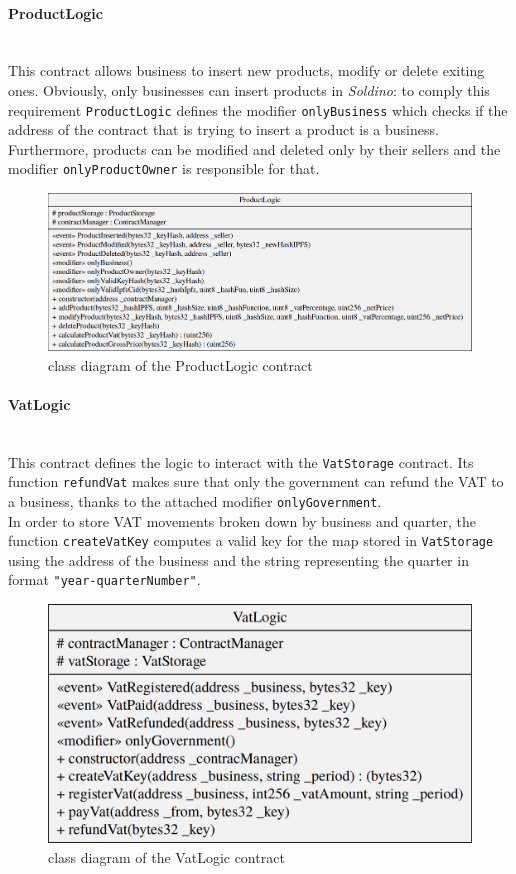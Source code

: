 \paragraph{ProductLogic}\mbox{}\\

\noindent This contract allows business to insert new products, modify or delete exiting ones. Obviously, only businesses can insert products in \textit{Soldino}: to comply this requirement \texttt{ProductLogic} defines the modifier \texttt{onlyBusiness} which checks if the address of the contract that is trying to insert a product is a business. Furthermore, products can be modified and deleted only by their sellers and the modifier \texttt{onlyProductOwner} is responsible for that.
\begin{figure}[H]
	\centering
	\includegraphics[scale=0.25]{res/images/solidity/productlogic.png}
	\caption{class diagram of the ProductLogic contract}
\end{figure}
\pagebreak
\paragraph{VatLogic}\mbox{}\\

\noindent This contract defines the logic to interact with the \texttt{VatStorage} contract. 
Its function \texttt{refundVat} makes sure that only the government can refund the VAT to a business, thanks to the attached modifier \texttt{onlyGovernment}.\\
In order to store VAT movements broken down by business and quarter, the function \texttt{createVatKey} computes a valid key for the map stored in \texttt{VatStorage} using the address of the business and the string representing the quarter in format \texttt{"year-quarterNumber"}. 
\begin{figure}[H]
	\centering
	\includegraphics[scale=0.20]{res/images/solidity/vatlogic.png}
	\caption{class diagram of the VatLogic contract}
\end{figure}
\pagebreak
